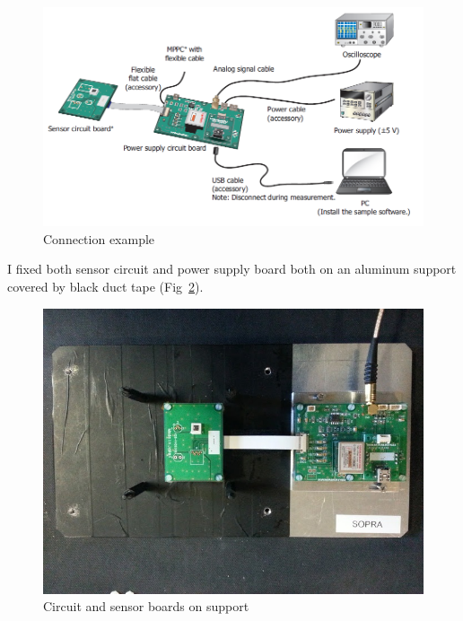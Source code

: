 \documentclass[10pt,a4paper, openany]{book}
\begin{document}
\begin{figure}[!h]
\begin{center}
\includegraphics[scale=0.4]{imm/mppc.png}
\end{center}
\caption{Connection example}
\label{fig:mppc}
\end{figure}

I fixed both sensor circuit and power supply board both on an aluminum support covered by black duct tape (Fig~\ref{fig:mppc2}).
\begin{figure}[!h]
\begin{center}
\includegraphics[scale=0.5]{imm/mppc2.jpg}
\end{center}
\caption{Circuit and sensor boards on support}
\label{fig:mppc2}
\end{figure}
\end{document}
